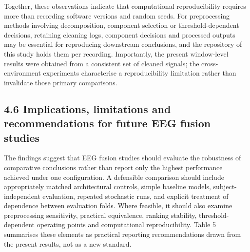 \documentclass[11pt,a4paper]{article}
\begin{document}
Together, these observations indicate that computational reproducibility requires more
than recording software versions and random seeds. For preprocessing methods involving
decomposition, component selection or threshold-dependent decisions, retaining cleaning
logs, component decisions and processed outputs may be essential for reproducing
downstream conclusions, and the repository of this study holds them per recording.
Importantly, the present window-level results were obtained from a consistent set of
cleaned signals; the cross-environment experiments characterise a reproducibility
limitation rather than invalidate those primary comparisons.

\subsection{4.6 Implications, limitations and recommendations for future EEG fusion studies}\label{implications-limitations-and-recommendations-for-future-eeg-fusion-studies}

The findings suggest that EEG fusion studies should evaluate the robustness of
comparative conclusions rather than report only the highest performance achieved under
one configuration. A defensible comparison should include appropriately matched
architectural controls, simple baseline models, subject-independent evaluation, repeated
stochastic runs, and explicit treatment of dependence between evaluation folds. Where
feasible, it should also examine preprocessing sensitivity, practical equivalence,
ranking stability, threshold-dependent operating points and computational
reproducibility. Table 5 summarises these elements as practical reporting
recommendations drawn from the present results, not as a new standard.

\begingroup\footnotesize
\end{document}
